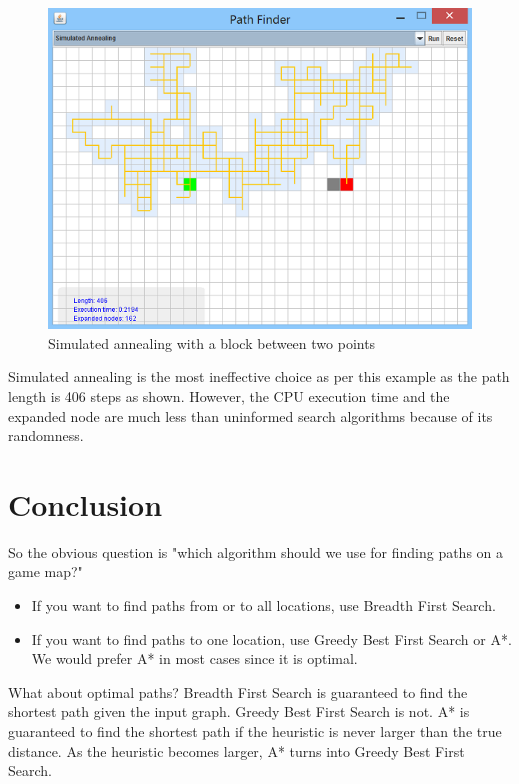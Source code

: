 \documentclass[a4paper]{article}
\begin{document}
\begin{figure}[h!]
  \centering
    \includegraphics[scale=.9]{images/sa1.png}
  \caption{Simulated annealing with a block between two points}
\end{figure}

\noindent Simulated annealing is the most ineffective choice as per this example as the path length is 406 steps as shown. However, the CPU execution time and the expanded node are much less than uninformed search algorithms because of its randomness.



\section{Conclusion}

So the obvious question is "which algorithm should we use for finding paths on a game map?"

\begin{itemize}
\item If you want to find paths from or to all locations, use Breadth First Search.
\item If you want to find paths to one location, use Greedy Best First Search or A*. We would prefer A* in most cases since it is optimal.
\end{itemize}

\noindent What about optimal paths? Breadth First Search is guaranteed to find the shortest path given the input graph. Greedy Best First Search is not. A* is guaranteed to find the shortest path if the heuristic is never larger than the true distance. As the heuristic becomes larger, A* turns into Greedy Best First Search.\\
\end{document}
